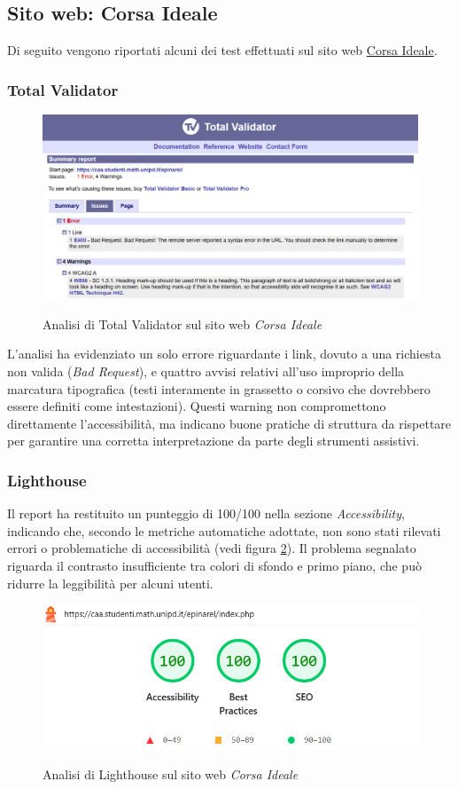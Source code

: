 \subsection{Sito web: Corsa Ideale}
\noindent Di seguito vengono riportati alcuni dei test effettuati sul sito web \href{https://caa.studenti.math.unipd.it/epinarel/}{Corsa Ideale}.
\subsubsection{Total Validator}
\begin{figure}[H]
    \centering
    \includegraphics[width=0.8\linewidth, alt={Screenshot dell'analisi di Total Validator sul sito web Corsa Ideale}]{img/TV_corsaideale.png}
    \caption{Analisi di Total Validator sul sito web \textit{Corsa Ideale}}\label{fig:TV_corsaideale}
\end{figure}

\noindent \noindent L’analisi ha evidenziato un solo errore riguardante i link, dovuto a una richiesta non valida (\textit{Bad Request}), e quattro avvisi relativi all’uso improprio della marcatura tipografica (testi interamente in grassetto o corsivo che dovrebbero essere definiti come intestazioni). Questi warning non compromettono direttamente l’accessibilità, ma indicano buone pratiche di struttura da rispettare per garantire una corretta interpretazione da parte degli strumenti assistivi.

\subsubsection{Lighthouse}
\noindent Il report ha restituito un punteggio di 100/100 nella sezione \textit{Accessibility}, indicando che, secondo le metriche automatiche adottate, non sono stati rilevati errori o problematiche di accessibilità (vedi figura \ref{fig:Lighthouse_corsaideale}). 
Il problema segnalato riguarda il contrasto insufficiente tra colori di sfondo e primo piano, che può ridurre la leggibilità per alcuni utenti. 
\begin{figure}[H]
    \centering
    \includegraphics[width=0.6\linewidth, alt={Screenshot dell'analisi di Lighthouse sul sito web Corsa Ideale}]{img/Lighthouse_corsaideale.png}
    \caption{Analisi di Lighthouse sul sito web \textit{Corsa Ideale}}\label{fig:Lighthouse_corsaideale}
\end{figure}

